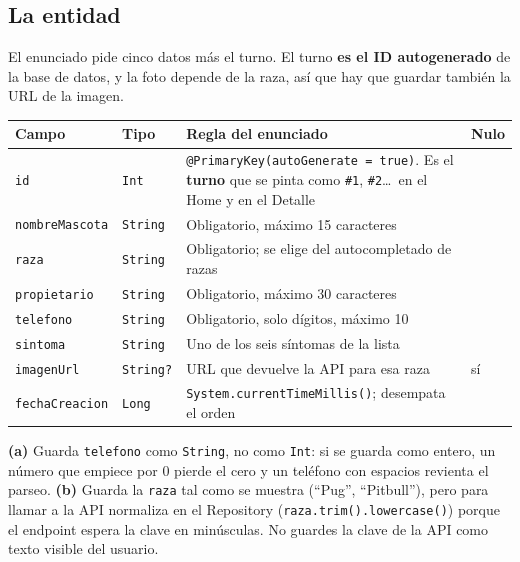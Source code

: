 \documentclass[11pt,letterpaper]{article}
\newcommand{\code}[1]{\texttt{\small #1}}
\newcommand{\no}{\textcolor{badred}{\ding{55}}}
\begin{document}
\subsection{La entidad}

El enunciado pide cinco datos m\'as el turno. El turno \textbf{es el ID
autogenerado} de la base de datos, y la foto depende de la raza, as\'i que hay
que guardar tambi\'en la URL de la imagen.

\begin{center}
\small
\begin{xltabular}{\linewidth}{@{}l l X l@{}}
\toprule
\textbf{Campo} & \textbf{Tipo} & \textbf{Regla del enunciado} & \textbf{Nulo}\\
\midrule
\endhead
\bottomrule
\endlastfoot
\code{id} & \code{Int} & \code{@PrimaryKey(\allowbreak{}autoGenerate =\allowbreak{} true)}. Es el \textbf{turno} que se pinta como \code{\#1}, \code{\#2}\ldots\ en el Home y en el Detalle & \no\\
\code{nombreMascota} & \code{String} & Obligatorio, m\'aximo 15 caracteres & \no\\
\code{raza} & \code{String} & Obligatorio; se elige del autocompletado de razas & \no\\
\code{propietario} & \code{String} & Obligatorio, m\'aximo 30 caracteres & \no\\
\code{telefono} & \code{String} & Obligatorio, solo d\'igitos, m\'aximo 10 & \no\\
\code{sintoma} & \code{String} & Uno de los seis s\'intomas de la lista & \no\\
\code{imagenUrl} & \code{String?} & URL que devuelve la API para esa raza & s\'i\\
\code{fechaCreacion} & \code{Long} & \code{System.\allowbreak{}currentTimeMillis(\allowbreak{})}; desempata el orden & \no\\
\end{xltabular}
\end{center}

\begin{notabox}
\textbf{(a)} Guarda \code{telefono} como \code{String}, no como \code{Int}:
si se guarda como entero, un n\'umero que empiece por 0 pierde el cero y un
tel\'efono con espacios revienta el parseo. \textbf{(b)} Guarda la
\code{raza} tal como se muestra (``Pug'', ``Pitbull''), pero para llamar a la API
normaliza en el Repository (\code{raza.trim().lowercase(\allowbreak{})}) porque el endpoint
espera la clave en min\'usculas. No guardes la clave de la API como texto visible
del usuario.
\end{notabox}
\end{document}
